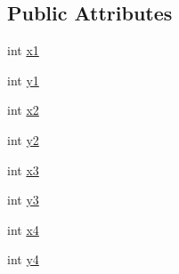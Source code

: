 \subsection*{Public Attributes}
\begin{DoxyCompactItemize}
\item 
int \hyperlink{structsvl_quad_addbddfb4d8835305e7993bc95beb5396}{x1}
\item 
int \hyperlink{structsvl_quad_a27d5a63998c61d8e3d0a6a8d49b0f867}{y1}
\item 
int \hyperlink{structsvl_quad_ad76051b0fd6671b8c7d8a789a0c0bf2b}{x2}
\item 
int \hyperlink{structsvl_quad_af793c440c3bca87d594bb157fbf7a129}{y2}
\item 
int \hyperlink{structsvl_quad_ab057dbdbfeafdb523773a523d8bb3ed3}{x3}
\item 
int \hyperlink{structsvl_quad_a0e4a4b82cc4977a4ac0e9159983e0d89}{y3}
\item 
int \hyperlink{structsvl_quad_aa2161465036bb13654d38e6aa4272493}{x4}
\item 
int \hyperlink{structsvl_quad_ab868a587999108937b8dd2748e90e1dd}{y4}
\end{DoxyCompactItemize}


